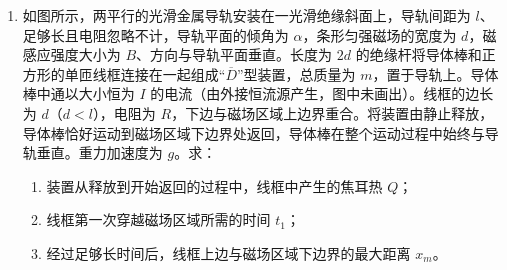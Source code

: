 \documentclass[\gkver]{gaokaozhenti}
\begin{document}
\begin{enumerate}
{	（2）设粒子到出口处被加速了 $n$ 圈，$2nqU=\frac{1}{2}mv^{2}$，$qvB=m\frac{v^{2}}{R}$，$T=\frac{2\pi m}{qB}$，$t=nT$，解得 $t=\frac{\pi BR^{2}}{2U}$。

	（3）加速电场的频率应等于粒子在磁场中做圆周运动的频率，即 $f=\frac{qB}{2\pi m}$；当磁感应强度为 $B_{m}$ 时，加速电场的频率应为 $f_{Bm}=\frac{qB_{m}}{2\pi m}$，粒子的动能 $E_{K}=\frac{1}{2}mv^{2}$。当 $f_{Bm}\leq f_{m}$ 时，粒子的最大动能由 $B_{m}$ 决定，$qv_{m}B_{m}=m\frac{v_{m}^{2}}{R}$，解得 $E_{km}=\frac{q^{2}B_{m}^{2}R^{2}}{2m}$；当 $f_{Bm}\geq f_{m}$ 时，粒子的最大动能由 $f_{m}$ 决定，$v_{m}=2\pi f_{m}R$，解得 $E_{km}=2\pi^{2}mf_{m}^{2}R^{2}$。
}

\item
如图所示，两平行的光滑金属导轨安装在一光滑绝缘斜面上，导轨间距为 $l$、足够长且电阻忽略不计，导轨平面的倾角为 $\alpha$，条形匀强磁场的宽度为 $d$，磁感应强度大小为 $B$、方向与导轨平面垂直。长度为 $2d$ 的绝缘杆将导体棒和正方形的单匝线框连接在一起组成“$\overline{D}$”型装置，总质量为 $m$，置于导轨上。导体棒中通以大小恒为 $I$ 的电流（由外接恒流源产生，图中未画出）。线框的边长为 $d$（$d<l$），电阻为 $R$，下边与磁场区域上边界重合。将装置由静止释放，导体棒恰好运动到磁场区域下边界处返回，导体棒在整个运动过程中始终与导轨垂直。重力加速度为 $g$。求：
\begin{enumerate}
	\item
	装置从释放到开始返回的过程中，线框中产生的焦耳热 $Q$；
	\item
	线框第一次穿越磁场区域所需的时间 $t_{1}$；
	\item
	经过足够长时间后，线框上边与磁场区域下边界的最大距离 $x_{m}$。
\end{enumerate}
\end{enumerate}
\end{document}

